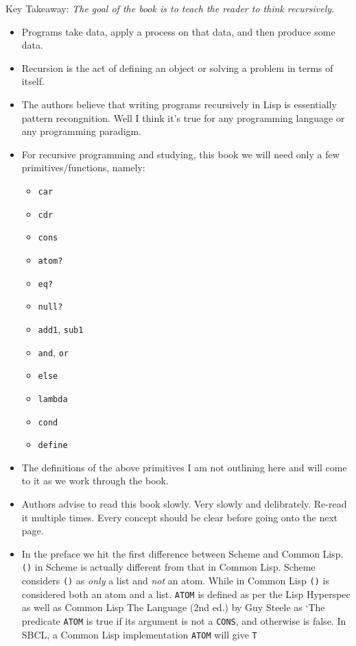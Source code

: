 \documentclass[11pt]{article}
\begin{document}
Key Takeaway:
\emph{The goal of the book is to teach the reader to think recursively.}

\vspace{1em}

\begin{itemize}
\item Programs take data, apply a process on that data, and then produce some data.
\item Recursion is the act of defining an object or solving a problem in terms of itself.
\item The authors believe that writing programs recursively in Lisp is essentially pattern recongnition. Well I think
it's true for any programming language or any programming paradigm.
\item For recursive programming and studying, this book we will need only a few primitives/functions, namely:
\begin{itemize}
\item \texttt{car}
\item \texttt{cdr}
\item \texttt{cons}
\item \texttt{atom?}
\item \texttt{eq?}
\item \texttt{null?}
\item \texttt{add1}, \texttt{sub1}
\item \texttt{and}, \texttt{or}
\item \texttt{else}
\item \texttt{lambda}
\item \texttt{cond}
\item \texttt{define}
\end{itemize}
\item The definitions of the above primitives I am not outlining here and will come to it as we work through the book.
\item Authors advise to read this book slowly. Very slowly and delibrately. Re-read it multiple times. Every concept
should be clear before going onto the next page.
\item In the preface we hit the first difference between Scheme and Common Lisp. \texttt{()} in Scheme is actually different
from that in Common Lisp. Scheme considers \texttt{()} as \emph{only} a list and \emph{not} an atom. While in Common Lisp \texttt{()} is
considered both an atom and a list. \texttt{ATOM} is defined as per the Lisp Hyperspec as well as Common Lisp The
Language (2nd ed.) by Guy Steele as `The predicate \texttt{ATOM} is true if its argument is not a \texttt{CONS}, and otherwise
is false. In SBCL, a Common Lisp implementation  \texttt{ATOM} will give \texttt{T}


\end{itemize}
\end{document}
